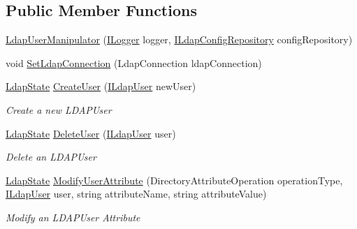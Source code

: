 \subsection*{Public Member Functions}
\begin{DoxyCompactItemize}
\item 
\hyperlink{class_l_d_a_p_library_1_1_ldap_user_manipulator_a274adcc84fad435c4570950874dce85a}{Ldap\+User\+Manipulator} (\hyperlink{interface_l_d_a_p_library_1_1_interfarces_1_1_i_logger}{I\+Logger} logger, \hyperlink{interface_l_d_a_p_library_1_1_interfarces_1_1_i_ldap_config_repository}{I\+Ldap\+Config\+Repository} config\+Repository)
\item 
void \hyperlink{class_l_d_a_p_library_1_1_ldap_user_manipulator_ab8a1cbc0234d21d53a7818e932debd18}{Set\+Ldap\+Connection} (Ldap\+Connection ldap\+Connection)
\item 
\hyperlink{namespace_l_d_a_p_library_1_1_enums_a052eaa58cba3f62d4c008a3b1b347e03}{Ldap\+State} \hyperlink{class_l_d_a_p_library_1_1_ldap_user_manipulator_a7bf53fbd524b9f7ce775097be0d1a81e}{Create\+User} (\hyperlink{interface_l_d_a_p_library_1_1_interfarces_1_1_i_ldap_user}{I\+Ldap\+User} new\+User)
\begin{DoxyCompactList}\small\item\em Create a new L\+D\+A\+P\+User \end{DoxyCompactList}\item 
\hyperlink{namespace_l_d_a_p_library_1_1_enums_a052eaa58cba3f62d4c008a3b1b347e03}{Ldap\+State} \hyperlink{class_l_d_a_p_library_1_1_ldap_user_manipulator_a27fb5fed7443ac3b7e626168d579eb51}{Delete\+User} (\hyperlink{interface_l_d_a_p_library_1_1_interfarces_1_1_i_ldap_user}{I\+Ldap\+User} user)
\begin{DoxyCompactList}\small\item\em Delete an L\+D\+A\+P\+User \end{DoxyCompactList}\item 
\hyperlink{namespace_l_d_a_p_library_1_1_enums_a052eaa58cba3f62d4c008a3b1b347e03}{Ldap\+State} \hyperlink{class_l_d_a_p_library_1_1_ldap_user_manipulator_a07f112397d2bd92de2389de22de15da6}{Modify\+User\+Attribute} (Directory\+Attribute\+Operation operation\+Type, \hyperlink{interface_l_d_a_p_library_1_1_interfarces_1_1_i_ldap_user}{I\+Ldap\+User} user, string attribute\+Name, string attribute\+Value)
\begin{DoxyCompactList}\small\item\em Modify an L\+D\+A\+P\+User Attribute \end{DoxyCompactList}\item 

\end{DoxyCompactItemize}
